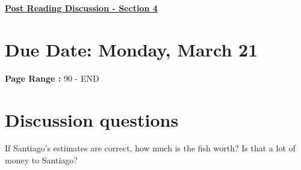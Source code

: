 \documentclass[12pt]{article} %
\begin{document}
	\renewcommand*{\coursecode}{MATH 235} %
	\renewcommand*{\assgnnumber}{Assignment 1} %
	\renewcommand*{\submdate}{September 14, 2021} %
	\renewcommand*{\studentfname}{Abdullah} %
	\renewcommand*{\studentlname}{Zubair} %
    \renewcommand*{\proofname}{Proof:}

	\renewcommand\qedsymbol{$\blacksquare$}
	\setfigpath
	\fancyhfoffset[L,O]{0pt} %




\begin{center}
	\textbf{\underline{\Huge{Post Reading Discussion - Section 4}}}
\end{center}

\section*{Due Date: Monday, March 21}
\large{\textbf{Page Range :} 90 - END}



\section*{Discussion questions}
\begin{qstn}
  If Santiago's estimates are correct, how much is the fish worth? Is that a lot of money to Santiago?
\end{qstn}
\end{document}
